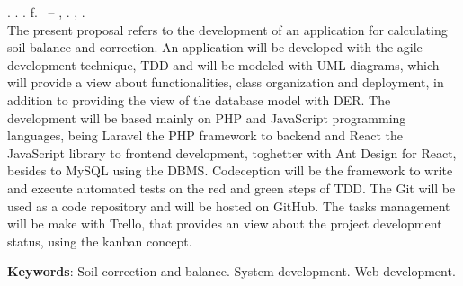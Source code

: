 
\begin{resumo}[ABSTRACT]
\begin{SingleSpacing}

\imprimirautorcitacao. \imprimirtitleabstract. \imprimirdata. \pageref {LastPage} f. \imprimirprojeto\ – \imprimirprograma, \imprimirinstituicao. \imprimirlocal, \imprimirdata.\\

The present proposal refers to the development of an application for calculating soil balance and correction. An application will be developed with the agile development technique, TDD and will be modeled with UML diagrams, which will provide a view about functionalities, class organization and deployment, in addition to providing the view of the database model with DER. The development will be based mainly on PHP and JavaScript programming languages, being Laravel the PHP framework to backend and React the JavaScript library to frontend development, toghetter with Ant Design for React, besides to MySQL using the DBMS. Codeception will be the framework to write and execute automated tests on the red and green steps of TDD. The Git will be used as a code repository and will be hosted on GitHub. The tasks management will be make with Trello, that provides an view about the project development status, using the kanban concept.

\textbf{Keywords}: Soil correction and balance. System development. Web development.

\end{SingleSpacing}
\end{resumo}

